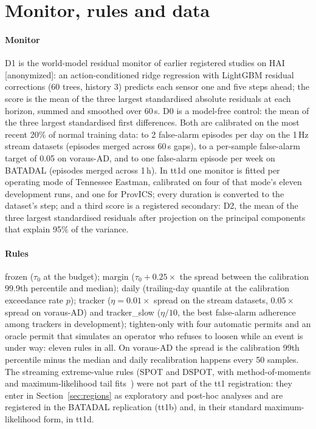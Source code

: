 \documentclass[letterpaper,twocolumn,10pt]{article}
\begin{document}
\section{Monitor, rules and data}
\label{sec:setup}

\paragraph{Monitor}
D1 is the world-model residual monitor of earlier registered studies on HAI [anonymized]: an
action-conditioned ridge regression with LightGBM residual corrections (60 trees, history 3)
predicts each sensor one and five steps ahead; the score is the mean of the three largest
standardised absolute residuals at each horizon, summed and smoothed over 60\,s. D0 is a model-free
control: the mean of the three largest standardised first differences. Both are calibrated on the
most recent 20\% of normal training data: to 2 false-alarm episodes per day on the 1\,Hz stream
datasets (episodes merged across 60\,s gaps), to a per-sample false-alarm target of 0.05 on
voraus-AD, and to one false-alarm episode per week on BATADAL (episodes merged across 1\,h). In tt1d
one monitor is fitted per operating mode of Tennessee Eastman, calibrated on four of that mode's eleven
development runs, and one for ProvICS; every duration is converted to the dataset's step; and a third
score is a registered secondary: D2, the mean of the three largest standardised residuals after
projection on the principal components that explain 95\% of the variance.

\paragraph{Rules}
frozen ($\tau_0$ at the budget); margin ($\tau_0 + 0.25 \times$ the spread between the calibration
99.9th percentile and median); daily (trailing-day quantile at the calibration exceedance rate $p$);
tracker ($\eta = 0.01 \times$ spread on the stream datasets, $0.05 \times$ spread on voraus-AD) and
tracker\_slow ($\eta / 10$, the best false-alarm adherence among trackers in development);
tighten-only with four automatic permits and an oracle permit that simulates an operator who refuses
to loosen while an event is under way: eleven rules in all. On voraus-AD the spread is the
calibration 99th percentile minus the median and daily recalibration happens every 50 samples. The
streaming extreme-value rules (SPOT and DSPOT, with method-of-moments and maximum-likelihood tail
fits~\cite{hosking1987gpd, siffer2017spot}) were not part of the tt1 registration: they enter in
Section~\ref{sec:regions} as exploratory and post-hoc analyses and are registered in the BATADAL
replication (tt1b) and, in their standard maximum-likelihood form, in tt1d.
\end{document}
